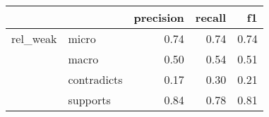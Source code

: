 \begin{tabular}{llrrr}
\toprule
         &          &  precision &  recall &   f1 \\
\midrule
rel\_weak & micro &       0.74 &    0.74 & 0.74 \\
         & macro &       0.50 &    0.54 & 0.51 \\
         & contradicts &       0.17 &    0.30 & 0.21 \\
         & supports &       0.84 &    0.78 & 0.81 \\
\bottomrule
\end{tabular}
